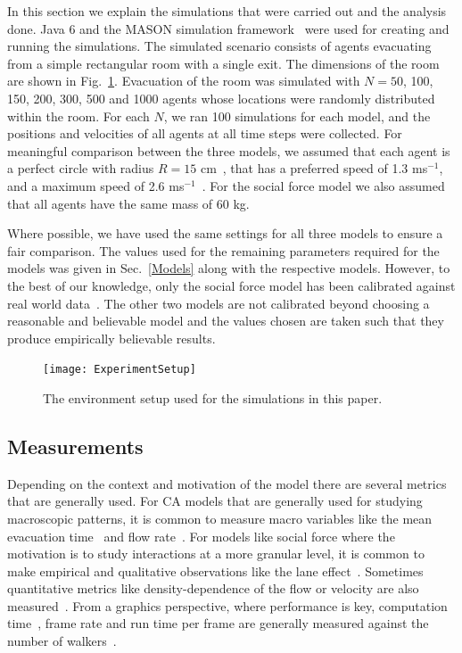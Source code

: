 In this section we explain the simulations that were carried out and the analysis done. Java 6 and the MASON simulation framework~\cite{Luke:2005wc} were used for creating and running the simulations. The simulated scenario consists of agents evacuating from a simple rectangular room with a single exit. The dimensions of the room are shown in Fig.~\ref{fig:experimentalSetup}. Evacuation of the room was simulated with $N = 50$, 100, 150, 200, 300, 500 and 1000 agents whose locations were randomly distributed within the room. For each $N$, we ran 100 simulations for each model, and the positions and velocities of all agents at all time steps were collected. For meaningful comparison between the three models, we assumed that each agent is a perfect circle with radius $R = 15$ cm~\cite{Pan:2006vp}, that has a preferred speed of 1.3 ms$^{-1}$, and a maximum speed of 2.6 ms$^{-1}$~\cite{fruin1992designing}. For the social force model we also assumed that all agents have the same mass of 60 kg.

Where possible, we have used the same settings for all three models to ensure a fair comparison. The values used for the remaining parameters required for the models was given in Sec.~\ref{Models} along with the respective models. However, to the best of our knowledge, only the social force model has been calibrated against real world data~\cite{Bauer2011}. The other two models are not calibrated beyond choosing a reasonable and believable model and the values chosen are taken such that they produce empirically believable results.


\begin{figure}[htbp]
\centering
\texttt{[image: ExperimentSetup]}
\caption{The environment setup used for the simulations in this paper.}
\label{fig:experimentalSetup}
\end{figure}

\subsection{Measurements}

Depending on the context and motivation of the model there are several metrics that are generally used. For CA models that are generally used for studying macroscopic patterns, it is common to measure macro variables like the mean evacuation time~\cite{Nagai:2004kl} and flow rate~\cite{Tajima:2001to}. For models like social force where the motivation is to study interactions at a more granular level, it is common to make empirical and qualitative observations like the lane effect~\cite{PhysRevE.51.4282}. Sometimes quantitative metrics like density-dependence of the flow or velocity are also measured~\cite{Seyfried2008}. From a graphics perspective, where performance is key, computation time~\cite{Ondrej:2010hv}, frame rate and run time per frame are generally measured against the number of walkers~\cite{vandenBerg:2008fu}.

